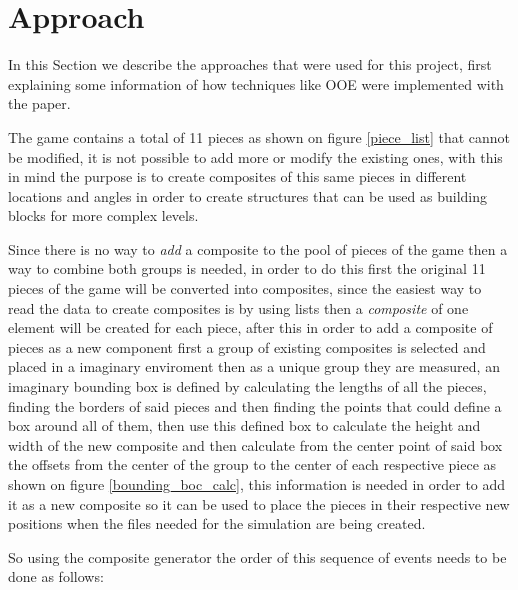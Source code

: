\documentclass[conference]{IEEEtran}
\begin{document}
\section{Approach}

In this Section we describe the approaches that were used for this project, first 
explaining some information of how techniques like OOE were implemented with the paper.

The game contains a total of 11 pieces as shown on figure \ref{piece_list} that
cannot be modified, it is not possible to add more or modify the existing ones,
with this in mind the purpose is to create composites of this same pieces in
different locations and angles in order to create structures that can be used as
building blocks for more complex levels. 

Since there is no way to \textit{add} a composite to the pool of pieces of the 
game then a way to combine both groups is needed, in order to do this first the 
original 11 pieces of the game will be converted into composites, since the easiest
way to read the data to create composites is by using lists then a \textit{composite} 
of one element will be created for each piece, after this in order to add a 
composite of pieces as a new component first a group of existing composites is 
selected and placed in a imaginary enviroment then as a unique group they are 
measured, an imaginary bounding box is defined by calculating the lengths of all
the pieces, finding the borders of said pieces and then finding the points that could
define a box around all of them, then use this defined box to calculate the 
height and width of the new composite and then calculate from 
the center point of said box the offsets from the center of the
group to the center of each respective piece as shown on figure
\ref{bounding_boc_calc}, this information is needed in order to add it as a new
composite so it can be used to place the pieces in their respective new positions
when the files needed for the simulation are being created.

So using the composite generator the order of this sequence of
events needs to be done as follows:


\end{document}

